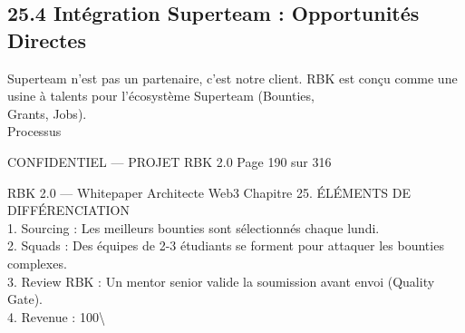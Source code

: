 \subsection{25.4 Intégration Superteam : Opportunités Directes}
Superteam n’est pas un partenaire, c’est notre client. RBK est conçu comme une usine à talents pour l’écosystème Superteam (Bounties,\\
Grants, Jobs).\\
\vspace{0.5em}
Processus\\
\vspace{0.5em}
\vspace{0.5em}
\vspace{0.5em}
\begin{confidential}CONFIDENTIEL — PROJET RBK 2.0                                   Page 190 sur 316\end{confidential}
RBK 2.0 — Whitepaper Architecte Web3                                                        Chapitre 25. ÉLÉMENTS DE DIFFÉRENCIATION\\
\vspace{0.5em}
\vspace{0.5em}
1. Sourcing : Les meilleurs bounties sont sélectionnés chaque lundi.\\
\vspace{0.5em}
2. Squads : Des équipes de 2-3 étudiants se forment pour attaquer les bounties complexes.\\
\vspace{0.5em}
3. Review RBK : Un mentor senior valide la soumission avant envoi (Quality Gate).\\
\vspace{0.5em}
4. Revenue : 100\textbackslash{}%
\vspace{0.5em}
\vspace{0.5em}
